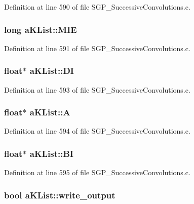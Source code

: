 Definition at line 590 of file SGP\_\-SuccessiveConvolutions.c.\hypertarget{structaKList_31da705df201058cb2789c63fd6be17a}{
\subsubsection[MIE]{\setlength{\rightskip}{0pt plus 5cm}long {\bf aKList::MIE}}}
\label{d8/d05/structaKList_31da705df201058cb2789c63fd6be17a}




Definition at line 591 of file SGP\_\-SuccessiveConvolutions.c.\hypertarget{structaKList_3e5e9b204bffe3e33b4d1304153ee61c}{
\subsubsection[DI]{\setlength{\rightskip}{0pt plus 5cm}float$\ast$ {\bf aKList::DI}}}
\label{d8/d05/structaKList_3e5e9b204bffe3e33b4d1304153ee61c}




Definition at line 593 of file SGP\_\-SuccessiveConvolutions.c.\hypertarget{structaKList_5fd3482239f3f60e99e6b2b0c746be88}{
\subsubsection[A]{\setlength{\rightskip}{0pt plus 5cm}float$\ast$ {\bf aKList::A}}}
\label{d8/d05/structaKList_5fd3482239f3f60e99e6b2b0c746be88}




Definition at line 594 of file SGP\_\-SuccessiveConvolutions.c.\hypertarget{structaKList_5ebd05f19ec8bb481bc6372166973552}{
\subsubsection[BI]{\setlength{\rightskip}{0pt plus 5cm}float$\ast$ {\bf aKList::BI}}}
\label{d8/d05/structaKList_5ebd05f19ec8bb481bc6372166973552}




Definition at line 595 of file SGP\_\-SuccessiveConvolutions.c.\hypertarget{structaKList_5c4591486a1c2979ee60d3b99644edee}{
\subsubsection[write\_\-output]{\setlength{\rightskip}{0pt plus 5cm}bool {\bf aKList::write\_\-output}}}
\label{d8/d05/structaKList_5c4591486a1c2979ee60d3b99644edee}




